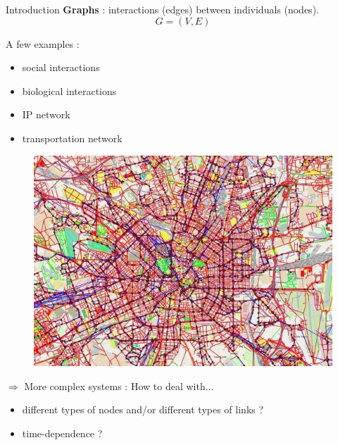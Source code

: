 \documentclass[15pt]{beamer}
\begin{document}
\begin{frame}{Introduction}
\textbf{Graphs} : interactions (edges) between individuals (nodes).
\[
	G=(V,E)
\]
\pause
\begin{minipage}{0.4\linewidth}
{\large A few examples :}
\begin{itemize}
    \item social interactions
    \item biological interactions
    \item IP network
    \item transportation network
\end{itemize}
\end{minipage}
\pause
\begin{minipage}{0.5\linewidth}
\begin{figure}
	\centering
    \includegraphics[width=\textwidth]{img/multimodalTransport.jpg}
    \label{fig:exmultitransport}
\end{figure}
\end{minipage}
\pause

$\Rightarrow$ {\large More complex systems : How to deal with...}
\begin{itemize}
	\item different types of nodes and/or different types of links ?
    \item time-dependence ?
\end{itemize}
\end{frame}
\end{document}

